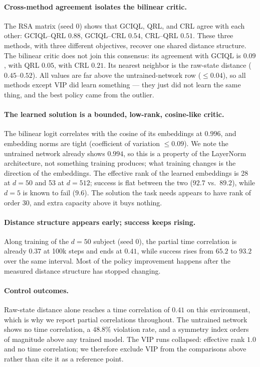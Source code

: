 \paragraph{Cross-method agreement isolates the bilinear critic.}
The RSA matrix (seed 0) shows that GCIQL, QRL, and CRL agree with each other: GCIQL--QRL
$0.88$, GCIQL--CRL $0.54$, CRL--QRL $0.51$. These three methods, with three different
objectives, recover one shared distance structure. The bilinear critic does not join this
consensus: its agreement with GCIQL is $0.09$, with QRL $0.05$, with CRL $0.21$. Its
nearest neighbor is the raw-state distance ($0.45$--$0.52$). All values are far above the
untrained-network row ($\le 0.04$), so all methods except VIP did learn something --- they
just did not learn the same thing, and the best policy came from the outlier.

\paragraph{The learned solution is a bounded, low-rank, cosine-like critic.}
The bilinear logit correlates with the cosine of its embeddings at $0.996$, and embedding
norms are tight (coefficient of variation $\le 0.09$). We note the untrained network
already shows $0.994$, so this is a property of the LayerNorm architecture, not something
training produces; what training changes is the direction of the embeddings. The effective
rank of the learned embeddings is 28 at $d{=}50$ and 53 at $d{=}512$; success is flat
between the two ($92.7$ vs.\ $89.2$), while $d{=}5$ is known to fail ($9.6$). The solution
the task needs appears to have rank of order 30, and extra capacity above it buys nothing.

\paragraph{Distance structure appears early; success keeps rising.}
Along training of the $d{=}50$ subject (seed 0), the partial time correlation is already
$0.37$ at 100k steps and ends at $0.41$, while success rises from $65.2$ to $93.2$ over the
same interval. Most of the policy improvement happens after the measured distance structure
has stopped changing.

\paragraph{Control outcomes.}
Raw-state distance alone reaches a time correlation of $0.41$ on this environment, which is
why we report partial correlations throughout. The untrained network shows no time
correlation, a $48.8\%$ violation rate, and a symmetry index orders of magnitude above any
trained model. The VIP runs collapsed: effective rank $1.0$ and no time correlation; we
therefore exclude VIP from the comparisons above rather than cite it as a reference point.

